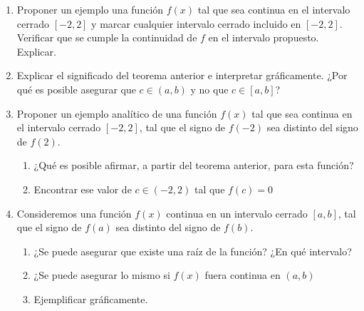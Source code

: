 \documentclass[12pt]{article}
\newtheorem*{myteo}{Teorema} %
\theoremstyle{definition}
\begin{document}
\begin{enumerate}
\vspace{0.3 cm}
\item Proponer un ejemplo una función $f(x)$ tal que sea continua en el intervalo cerrado $[-2,2]$ y marcar cualquier intervalo cerrado incluido en $[-2,2]$. Verificar que se cumple la continuidad de $f$ en el intervalo propuesto. Explicar.
\vspace{0.3 cm}

\vspace{0.2 cm}

\item  Explicar el significado del teorema anterior e interpretar gráficamente. ¿Por qué es posible asegurar que $c \in (a, b)$ y no que $c \in [a, b]$? 

\item  Proponer un ejemplo analítico de una función $f(x)$ tal que sea continua en el intervalo cerrado $[-2,2]$, tal que el signo de $f(-2)$ sea distinto del signo de $f(2)$.
 \begin{enumerate}
\item ¿Qué es posible afirmar, a partir del teorema anterior, para esta función?
\item  Encontrar ese valor de $c \in (-2,2)$ tal que $f(c) = 0$
\end{enumerate}

\item  Consideremos una función $f(x)$ continua en un  intervalo cerrado $[a,b]$, tal que el signo de $f(a)$ sea distinto del signo de $f(b)$.
 \begin{enumerate}
\item  ¿Se puede asegurar que existe una raíz de la función? ¿En qué intervalo?
\item  ¿Se puede asegurar lo mismo si $f(x)$ fuera continua en $(a, b)$
 \item  Ejemplificar gráficamente.
\end{enumerate}



\end{enumerate}
\end{document}
